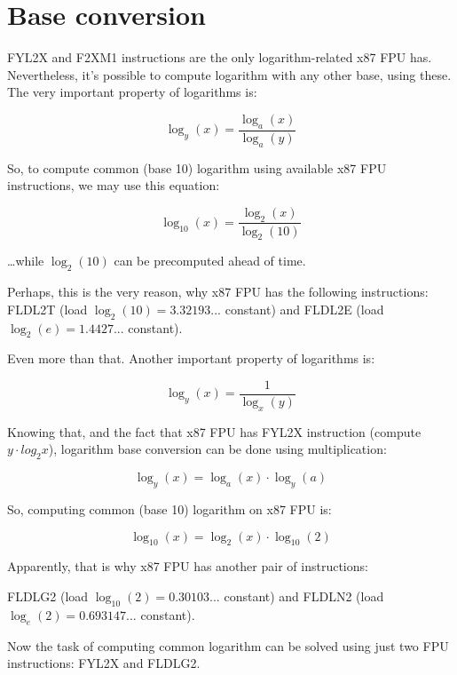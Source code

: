\section{Base conversion}

FYL2X and F2XM1 instructions are the only logarithm-related x87 FPU has.
Nevertheless, it's possible to compute logarithm with any other base, using these.
The very important property of logarithms is:

\begin{equation}
\log_y (x) = \frac{\log_a (x)}{\log_a (y)}
\end{equation}

So, to compute common (base 10) logarithm using available x87 FPU instructions, we may use this equation:

\begin{equation}
\log_{10} (x) = \frac{\log_2 (x)}{\log_2 (10)}
\end{equation}

\dots while $\log_2(10)$ can be precomputed ahead of time.

Perhaps, this is the very reason, why x87 FPU has the following instructions:
FLDL2T (load $\log_2 (10)=3.32193...$ constant) and FLDL2E (load $\log_2 (e)=1.4427...$ constant).

Even more than that.
Another important property of logarithms is:

\begin{equation}
\log_y (x) = \frac{1}{\log_x (y)}
\end{equation}

Knowing that, and the fact that x87 FPU has FYL2X instruction (compute $y \cdot log_2 x$), logarithm base conversion can be done using multiplication:

\begin{equation}
\log_y (x) = \log_a (x) \cdot \log_y (a)
\end{equation}

So, computing common (base 10) logarithm on x87 FPU is:

\begin{equation}
\log_{10} (x) = \log_2 (x) \cdot \log_{10} (2)
\end{equation}

Apparently, that is why x87 FPU has another pair of instructions:

FLDLG2 (load $\log_{10} (2)=0.30103...$ constant) and FLDLN2 (load $\log_e (2)=0.693147...$ constant).

Now the task of computing common logarithm can be solved using just two FPU instructions: FYL2X and FLDLG2.

